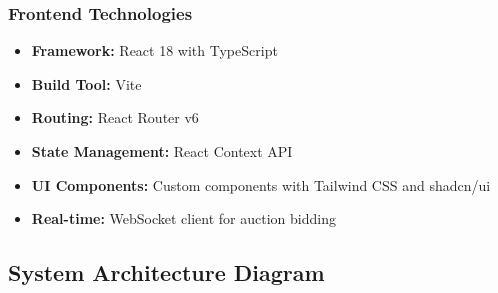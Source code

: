 \documentclass[12pt,a4paper]{article}
\begin{document}
\subsubsection{Frontend Technologies}
\begin{itemize}[leftmargin=*]
    \item \textbf{Framework:} React 18 with TypeScript
    \item \textbf{Build Tool:} Vite
    \item \textbf{Routing:} React Router v6
    \item \textbf{State Management:} React Context API
    \item \textbf{UI Components:} Custom components with Tailwind CSS and shadcn/ui
    \item \textbf{Real-time:} WebSocket client for auction bidding
\end{itemize}

\subsection{System Architecture Diagram}
\end{document}
